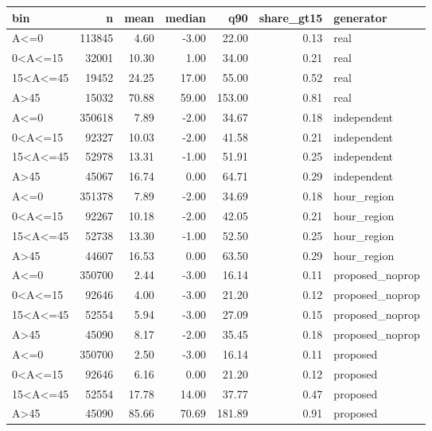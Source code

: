 \begin{tabular}{lrrrrrl}
\toprule
bin & n & mean & median & q90 & share\_gt15 & generator \\
\midrule
A<=0 & 113845 & 4.60 & -3.00 & 22.00 & 0.13 & real \\
0<A<=15 & 32001 & 10.30 & 1.00 & 34.00 & 0.21 & real \\
15<A<=45 & 19452 & 24.25 & 17.00 & 55.00 & 0.52 & real \\
A>45 & 15032 & 70.88 & 59.00 & 153.00 & 0.81 & real \\
A<=0 & 350618 & 7.89 & -2.00 & 34.67 & 0.18 & independent \\
0<A<=15 & 92327 & 10.03 & -2.00 & 41.58 & 0.21 & independent \\
15<A<=45 & 52978 & 13.31 & -1.00 & 51.91 & 0.25 & independent \\
A>45 & 45067 & 16.74 & 0.00 & 64.71 & 0.29 & independent \\
A<=0 & 351378 & 7.89 & -2.00 & 34.69 & 0.18 & hour\_region \\
0<A<=15 & 92267 & 10.18 & -2.00 & 42.05 & 0.21 & hour\_region \\
15<A<=45 & 52738 & 13.30 & -1.00 & 52.50 & 0.25 & hour\_region \\
A>45 & 44607 & 16.53 & 0.00 & 63.50 & 0.29 & hour\_region \\
A<=0 & 350700 & 2.44 & -3.00 & 16.14 & 0.11 & proposed\_noprop \\
0<A<=15 & 92646 & 4.00 & -3.00 & 21.20 & 0.12 & proposed\_noprop \\
15<A<=45 & 52554 & 5.94 & -3.00 & 27.09 & 0.15 & proposed\_noprop \\
A>45 & 45090 & 8.17 & -2.00 & 35.45 & 0.18 & proposed\_noprop \\
A<=0 & 350700 & 2.50 & -3.00 & 16.14 & 0.11 & proposed \\
0<A<=15 & 92646 & 6.16 & 0.00 & 21.20 & 0.12 & proposed \\
15<A<=45 & 52554 & 17.78 & 14.00 & 37.77 & 0.47 & proposed \\
A>45 & 45090 & 85.66 & 70.69 & 181.89 & 0.91 & proposed \\
\bottomrule
\end{tabular}
